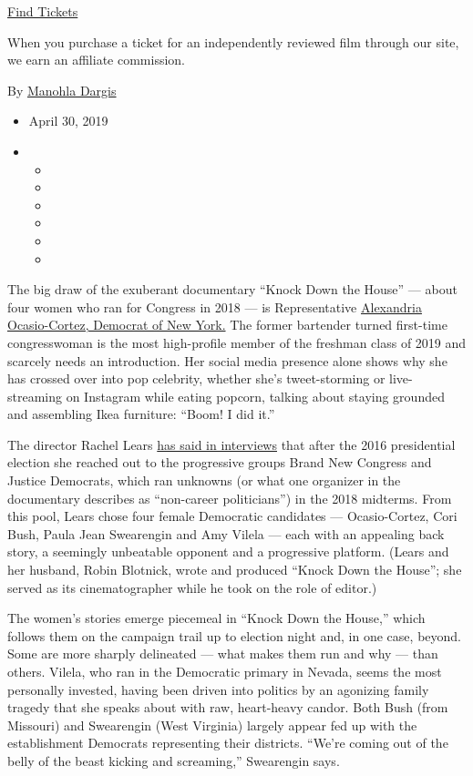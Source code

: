 \href{https://www.imdb.com/showtimes/title/tt9358052?ref_=ref_ext_NYT}{Find
Tickets}

When you purchase a ticket for an independently reviewed film through
our site, we earn an affiliate commission.

By \href{https://www.nytimes3xbfgragh.onion/by/manohla-dargis}{Manohla
Dargis}

\begin{itemize}
\item
  April 30, 2019
\item
  \begin{itemize}
  \item
  \item
  \item
  \item
  \item
  \item
  \end{itemize}
\end{itemize}

The big draw of the exuberant documentary ``Knock Down the House'' ---
about four women who ran for Congress in 2018 --- is Representative
\href{https://ocasio-cortez.house.gov/}{Alexandria Ocasio-Cortez,
Democrat of New York.} The former bartender turned first-time
congresswoman is the most high-profile member of the freshman class of
2019 and scarcely needs an introduction. Her social media presence alone
shows why she has crossed over into pop celebrity, whether she's
tweet-storming or live-streaming on Instagram while eating popcorn,
talking about staying grounded and assembling Ikea furniture: ``Boom! I
did it.''

The director Rachel Lears
\href{https://www.missourireview.com/true-false-film-festival-an-interview-with-rachel-lears/}{has
said in interviews} that after the 2016 presidential election she
reached out to the progressive groups Brand New Congress and Justice
Democrats, which ran unknowns (or what one organizer in the documentary
describes as ``non-career politicians'') in the 2018 midterms. From this
pool, Lears chose four female Democratic candidates --- Ocasio-Cortez,
Cori Bush, Paula Jean Swearengin and Amy Vilela --- each with an
appealing back story, a seemingly unbeatable opponent and a progressive
platform. (Lears and her husband, Robin Blotnick, wrote and produced
``Knock Down the House''; she served as its cinematographer while he
took on the role of editor.)

The women's stories emerge piecemeal in ``Knock Down the House,'' which
follows them on the campaign trail up to election night and, in one
case, beyond. Some are more sharply delineated --- what makes them run
and why --- than others. Vilela, who ran in the Democratic primary in
Nevada, seems the most personally invested, having been driven into
politics by an agonizing family tragedy that she speaks about with raw,
heart-heavy candor. Both Bush (from Missouri) and Swearengin (West
Virginia) largely appear fed up with the establishment Democrats
representing their districts. ``We're coming out of the belly of the
beast kicking and screaming,'' Swearengin says.

